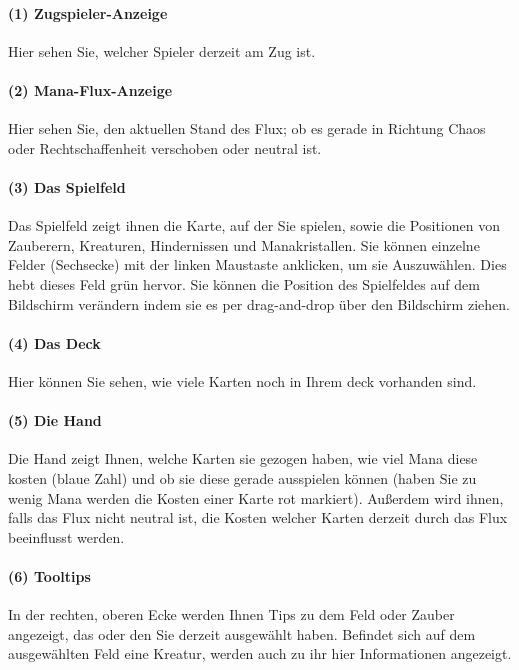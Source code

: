 \documentclass[a4paper,12pt]{scrartcl}
\begin{document}
	\paragraph{(1) Zugspieler-Anzeige}
	Hier sehen Sie, welcher Spieler derzeit am Zug ist.
	
	\paragraph{(2) Mana-Flux-Anzeige}
	Hier sehen Sie, den aktuellen Stand des Flux; ob es gerade in Richtung Chaos oder Rechtschaffenheit verschoben oder neutral ist.
	
	\paragraph{(3) Das Spielfeld}
	Das Spielfeld zeigt ihnen die Karte, auf der Sie spielen, sowie die Positionen von Zauberern, Kreaturen, Hindernissen und Manakristallen.
	Sie können einzelne Felder (Sechsecke) mit der linken Maustaste anklicken, um sie Auszuwählen. Dies hebt dieses Feld grün hervor.
	Sie können die Position des Spielfeldes auf dem Bildschirm verändern indem sie es per drag-and-drop über den Bildschirm ziehen.
	
	\paragraph{(4) Das Deck}
	Hier können Sie sehen, wie viele Karten noch in Ihrem deck vorhanden sind.
	
	\paragraph{(5) Die Hand}
	Die Hand zeigt Ihnen, welche Karten sie gezogen haben, wie viel Mana diese kosten (blaue Zahl) und ob sie diese gerade ausspielen können (haben Sie zu wenig Mana werden die Kosten einer Karte rot markiert).
	Außerdem wird ihnen, falls das Flux nicht neutral ist, die Kosten welcher Karten derzeit durch das Flux beeinflusst werden.
	
	\paragraph{(6) Tooltips}
	In der rechten, oberen Ecke werden Ihnen Tips zu dem Feld oder Zauber angezeigt, das oder den Sie derzeit ausgewählt haben.
	Befindet sich auf dem ausgewählten Feld eine Kreatur, werden auch zu ihr hier Informationen angezeigt.
	
\end{document}

